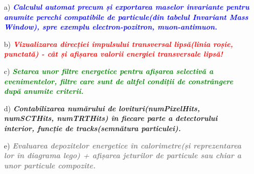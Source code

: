 \documentclass{beamer}
\begin{document}
\begin{frame}{\textbf{}}

\vspace{0cm}
\begin{enumerate}
  \small
  \item[a)] \makebox[0.5cm ]{} \textbf{\textit{ \textcolor{blue}{Calculul automat precum și exportarea maselor invariante pentru anumite perechi compatibile de particule(din tabelul Invariant Mass Window), spre exemplu electron-pozitron, muon-antimuon.}}}\\
 
  \item[b)] \makebox[0.5cm]{} \textit{\textbf{\textcolor{red}{Vizualizarea direcției impulsului transversal lipsă(linia roșie, punctată) - cât și afișarea valorii energiei transversale lipsă! }}}\\

   \item[c)] \makebox[0.5cm]{} \textit{\textbf{\textcolor{green}{Setarea unor filtre energetice pentru afișarea selectivă a evenimentelor, filtre care sunt de altfel condiții de constrângere după anumite criterii.}}}

    \item[d)] \makebox[0.5cm]{} \textit{\textbf{Contabilizarea numărului de lovituri(numPixelHits, numSCTHits, numTRTHits)  în fiecare parte a detectorului interior, funcție de tracks(semnătura particulei).}}

    \item[e)] \makebox[0.5cm]{} \textit{\textbf{\textcolor{gray}{Evaluarea depozitelor energetice în calorimetre(și reprezentarea lor în diagrama lego) + afișarea jeturilor de particule sau chiar a unor particule compozite.}}}

\end{enumerate}

\end{frame}
\end{document}

